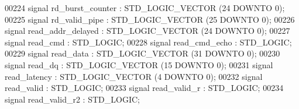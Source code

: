 \begin{DoxyCode}
00224                 \textcolor{keywordflow}{signal} \textcolor{vhdlchar}{rd_burst_counter} \textcolor{vhdlchar}{:}  \textcolor{comment}{STD\_LOGIC\_VECTOR} \textcolor{vhdlchar}{(}\textcolor{vhdllogic}{}\textcolor{vhdllogic}{24} \textcolor{keywordflow}{DOWNTO} \textcolor{vhdllogic}{}\textcolor{vhdllogic}{0}\textcolor{vhdlchar}{)};
00225                 \textcolor{keywordflow}{signal} \textcolor{vhdlchar}{rd_valid_pipe} \textcolor{vhdlchar}{:}  \textcolor{comment}{STD\_LOGIC\_VECTOR} \textcolor{vhdlchar}{(}\textcolor{vhdllogic}{}\textcolor{vhdllogic}{25} \textcolor{keywordflow}{DOWNTO} \textcolor{vhdllogic}{}\textcolor{vhdllogic}{0}\textcolor{vhdlchar}{)};
00226                 \textcolor{keywordflow}{signal} \textcolor{vhdlchar}{read_addr_delayed} \textcolor{vhdlchar}{:}  \textcolor{comment}{STD\_LOGIC\_VECTOR} \textcolor{vhdlchar}{(}\textcolor{vhdllogic}{}\textcolor{vhdllogic}{24} \textcolor{keywordflow}{DOWNTO} \textcolor{vhdllogic}{}\textcolor{vhdllogic}{0}\textcolor{vhdlchar}{)};
00227                 \textcolor{keywordflow}{signal} \textcolor{vhdlchar}{read_cmd} \textcolor{vhdlchar}{:}  \textcolor{comment}{STD\_LOGIC};
00228                 \textcolor{keywordflow}{signal} \textcolor{vhdlchar}{read_cmd_echo} \textcolor{vhdlchar}{:}  \textcolor{comment}{STD\_LOGIC};
00229                 \textcolor{keywordflow}{signal} \textcolor{vhdlchar}{read_data} \textcolor{vhdlchar}{:}  \textcolor{comment}{STD\_LOGIC\_VECTOR} \textcolor{vhdlchar}{(}\textcolor{vhdllogic}{}\textcolor{vhdllogic}{31} \textcolor{keywordflow}{DOWNTO} \textcolor{vhdllogic}{}\textcolor{vhdllogic}{0}\textcolor{vhdlchar}{)};
00230                 \textcolor{keywordflow}{signal} \textcolor{vhdlchar}{read_dq} \textcolor{vhdlchar}{:}  \textcolor{comment}{STD\_LOGIC\_VECTOR} \textcolor{vhdlchar}{(}\textcolor{vhdllogic}{}\textcolor{vhdllogic}{15} \textcolor{keywordflow}{DOWNTO} \textcolor{vhdllogic}{}\textcolor{vhdllogic}{0}\textcolor{vhdlchar}{)};
00231                 \textcolor{keywordflow}{signal} \textcolor{vhdlchar}{read_latency} \textcolor{vhdlchar}{:}  \textcolor{comment}{STD\_LOGIC\_VECTOR} \textcolor{vhdlchar}{(}\textcolor{vhdllogic}{}\textcolor{vhdllogic}{4} \textcolor{keywordflow}{DOWNTO} \textcolor{vhdllogic}{}\textcolor{vhdllogic}{0}\textcolor{vhdlchar}{)};
00232                 \textcolor{keywordflow}{signal} \textcolor{vhdlchar}{read_valid} \textcolor{vhdlchar}{:}  \textcolor{comment}{STD\_LOGIC};
00233                 \textcolor{keywordflow}{signal} \textcolor{vhdlchar}{read_valid_r} \textcolor{vhdlchar}{:}  \textcolor{comment}{STD\_LOGIC};
00234                 \textcolor{keywordflow}{signal} \textcolor{vhdlchar}{read_valid_r2} \textcolor{vhdlchar}{:}  \textcolor{comment}{STD\_LOGIC};

\end{DoxyCode}
